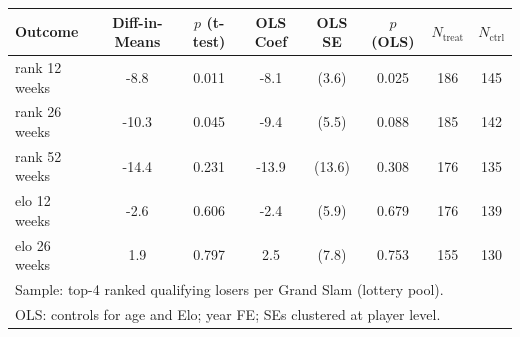 \begin{tabular}{lccccccc}
\toprule
Outcome & Diff-in-Means & $p$ (t-test) & OLS Coef & OLS SE & $p$ (OLS) & $N_{\text{treat}}$ & $N_{\text{ctrl}}$ \\
\midrule
rank 12 weeks & -8.8 & 0.011 & -8.1 & (3.6) & 0.025 & 186 & 145 \\
rank 26 weeks & -10.3 & 0.045 & -9.4 & (5.5) & 0.088 & 185 & 142 \\
rank 52 weeks & -14.4 & 0.231 & -13.9 & (13.6) & 0.308 & 176 & 135 \\
elo 12 weeks & -2.6 & 0.606 & -2.4 & (5.9) & 0.679 & 176 & 139 \\
elo 26 weeks & 1.9 & 0.797 & 2.5 & (7.8) & 0.753 & 155 & 130 \\
\midrule
\multicolumn{8}{l}{\footnotesize Sample: top-4 ranked qualifying losers per Grand Slam (lottery pool).} \\
\multicolumn{8}{l}{\footnotesize OLS: controls for age and Elo; year FE; SEs clustered at player level.} \\
\bottomrule
\end{tabular}
